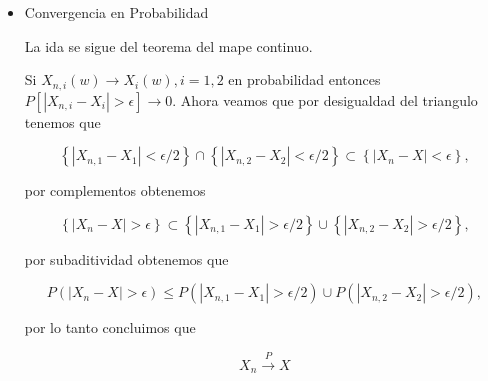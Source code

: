 \documentclass[letterpaper]{article}
\newcommand{\set}[1]{\left \{ #1 \right\} }
\newcommand{\1}{\mathbbm{1}}
\begin{document}
\begin{enumerate}
\begin{itemize}
			\item Convergencia en Probabilidad
			
			La ida se sigue del teorema del mape continuo.

			Si $X_{n,i}(w) \rightarrow X_i(w), i = {1,2}$ en probabilidad entonces $P[|X_{n,i} - X_i| > \epsilon] \rightarrow 0$. Ahora veamos que por desigualdad del triangulo tenemos que

			\[\set{|X_{n,1} - X_1| < \epsilon/2} \cap \set{|X_{n,2} - X_2| < \epsilon/2} \subset \set{|X_n - X| < \epsilon},\]

			por complementos obtenemos

			\[\set{|X_n - X| > \epsilon} \subset \set{|X_{n,1} - X_1| > \epsilon/2} \cup \set{|X_{n,2} - X_2| > \epsilon/2},\]

			por subaditividad obtenemos que

			\[P(|X_n - X| > \epsilon) \leq P(|X_{n,1} - X_1| > \epsilon/2) \cup P(|X_{n,2} - X_2| > \epsilon/2),\]

			por lo tanto concluimos que

			\[X_n \xrightarrow{P} X\]


		\end{itemize}

    \end{enumerate}

	
\end{document}

